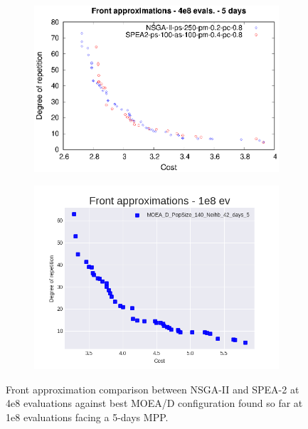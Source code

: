 \begin{figure}[H]
\begin{subfigure}{.5\textwidth}
  \centering
  \includegraphics[width=1.0\linewidth]{../references/fronts_5days.eps}
\end{subfigure}%
\begin{subfigure}{.5\textwidth}
  \centering
  \includegraphics[width=1.0\linewidth]{../experiments/plots/fronts/5_days/MOEA_D_PopSize_140_Neihb_42_days_5_6.png}
\end{subfigure}
\caption{Front approximation comparison between NSGA-II and SPEA-2 at 4e8 evaluations against best MOEA/D configuration found so far at 1e8 evaluations facing a 5-days MPP.}
\label{fig:front_comp_1}
\end{figure}

